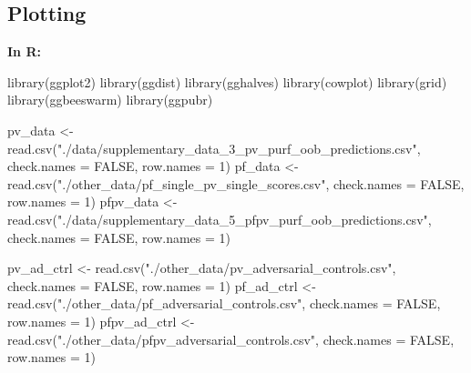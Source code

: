 \documentclass[
  11pt,
  oneside]{book}
\newenvironment{Shaded}{\begin{snugshade}}{\end{snugshade}}
\newcommand{\AttributeTok}[1]{\textcolor[rgb]{0.77,0.63,0.00}{#1}}
\newcommand{\ConstantTok}[1]{\textcolor[rgb]{0.00,0.00,0.00}{#1}}
\newcommand{\DecValTok}[1]{\textcolor[rgb]{0.00,0.00,0.81}{#1}}
\newcommand{\FunctionTok}[1]{\textcolor[rgb]{0.00,0.00,0.00}{#1}}
\newcommand{\NormalTok}[1]{#1}
\newcommand{\OtherTok}[1]{\textcolor[rgb]{0.56,0.35,0.01}{#1}}
\newcommand{\StringTok}[1]{\textcolor[rgb]{0.31,0.60,0.02}{#1}}
\begin{document}
\hypertarget{plotting-1}{%
\subsection{Plotting}\label{plotting-1}}

\textbf{In R: }

\begin{Shaded}
\begin{Highlighting}[]
\FunctionTok{library}\NormalTok{(ggplot2)}
\FunctionTok{library}\NormalTok{(ggdist)}
\FunctionTok{library}\NormalTok{(gghalves)}
\FunctionTok{library}\NormalTok{(cowplot)}
\FunctionTok{library}\NormalTok{(grid)}
\FunctionTok{library}\NormalTok{(ggbeeswarm)}
\FunctionTok{library}\NormalTok{(ggpubr)}
\end{Highlighting}
\end{Shaded}

\begin{Shaded}
\begin{Highlighting}[]
\NormalTok{pv\_data }\OtherTok{\textless{}{-}} \FunctionTok{read.csv}\NormalTok{(}\StringTok{"./data/supplementary\_data\_3\_pv\_purf\_oob\_predictions.csv"}\NormalTok{, }\AttributeTok{check.names =} \ConstantTok{FALSE}\NormalTok{, }\AttributeTok{row.names =} \DecValTok{1}\NormalTok{)}
\NormalTok{pf\_data }\OtherTok{\textless{}{-}} \FunctionTok{read.csv}\NormalTok{(}\StringTok{"./other\_data/pf\_single\_pv\_single\_scores.csv"}\NormalTok{, }\AttributeTok{check.names =} \ConstantTok{FALSE}\NormalTok{, }\AttributeTok{row.names =} \DecValTok{1}\NormalTok{)}
\NormalTok{pfpv\_data }\OtherTok{\textless{}{-}} \FunctionTok{read.csv}\NormalTok{(}\StringTok{"./data/supplementary\_data\_5\_pfpv\_purf\_oob\_predictions.csv"}\NormalTok{, }\AttributeTok{check.names =} \ConstantTok{FALSE}\NormalTok{, }\AttributeTok{row.names =} \DecValTok{1}\NormalTok{)}

\NormalTok{pv\_ad\_ctrl }\OtherTok{\textless{}{-}} \FunctionTok{read.csv}\NormalTok{(}\StringTok{"./other\_data/pv\_adversarial\_controls.csv"}\NormalTok{, }\AttributeTok{check.names =} \ConstantTok{FALSE}\NormalTok{, }\AttributeTok{row.names =} \DecValTok{1}\NormalTok{)}
\NormalTok{pf\_ad\_ctrl }\OtherTok{\textless{}{-}} \FunctionTok{read.csv}\NormalTok{(}\StringTok{"./other\_data/pf\_adversarial\_controls.csv"}\NormalTok{, }\AttributeTok{check.names =} \ConstantTok{FALSE}\NormalTok{, }\AttributeTok{row.names =} \DecValTok{1}\NormalTok{)}
\NormalTok{pfpv\_ad\_ctrl }\OtherTok{\textless{}{-}} \FunctionTok{read.csv}\NormalTok{(}\StringTok{"./other\_data/pfpv\_adversarial\_controls.csv"}\NormalTok{, }\AttributeTok{check.names =} \ConstantTok{FALSE}\NormalTok{, }\AttributeTok{row.names =} \DecValTok{1}\NormalTok{)}
\end{Highlighting}
\end{Shaded}
\end{document}
